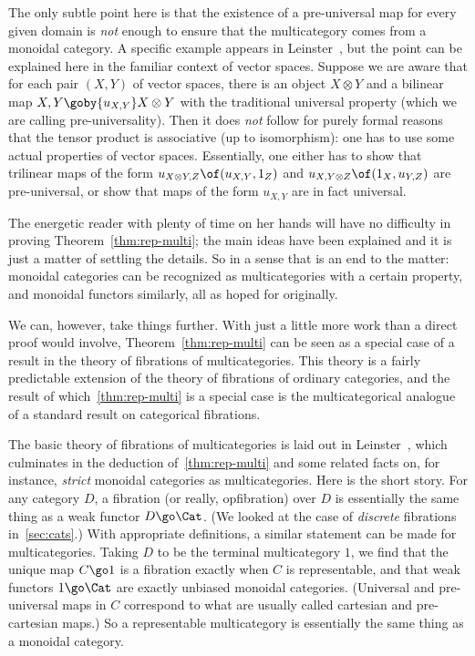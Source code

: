 The only subtle point here is that the existence of a pre-universal map for
every given domain is \emph{not} enough to ensure that the multicategory
comes from a monoidal category.  A specific example appears in
Leinster~\cite{FM}, but the point can be explained here in the familiar
context of vector spaces.  Suppose we are aware that for each pair $(X, Y)$
of vector spaces, there is an object $X\otimes Y$ and a bilinear map $X, Y
\goby{u_{X,Y}} X\otimes Y$ with the traditional universal property (which
we are calling pre-universality).  Then it does \emph{not} follow for
purely formal reasons that the tensor product is associative (up to
isomorphism): one has to use some actual properties of vector spaces.
Essentially, one either has to show that trilinear maps of the form
$u_{X\otimes Y, Z} \of (u_{X,Y}, 1_Z)$ and $u_{X, Y\otimes Z} \of (1_X,
u_{Y,Z})$ are pre-universal, or show that maps of the form $u_{X,Y}$ are in
fact universal.

The energetic reader with plenty of time on her hands will have no
difficulty in proving Theorem~\ref{thm:rep-multi}; the main ideas have been
explained and it is just a matter of settling the details.  So in a sense
that is an end to the matter: monoidal categories can be recognized as
multicategories with a certain property, and monoidal functors similarly,
all as hoped for originally.

We can, however, take things further.  With just a little more work than a
direct proof would involve, Theorem~\ref{thm:rep-multi} can be seen as a
special case of a result in the theory of fibrations%
%
%
of multicategories.
This theory is a fairly predictable extension of the theory of fibrations
of ordinary categories, and the result of which~\ref{thm:rep-multi} is a
special case is the multicategorical analogue of a standard result on
categorical fibrations.

The basic theory of fibrations of multicategories is laid out in
Leinster~\cite{FM}, which culminates in the deduction of~\ref{thm:rep-multi}
and some related facts on, for instance, \emph{strict} monoidal categories
as multicategories.  Here is the short story.  For any category $D$, a
fibration (or really, opfibration)
over $D$ is essentially the same thing as a weak functor $D \go \Cat$.  (We
looked at the case of \emph{discrete} fibrations in~\ref{sec:cats}.)  With
appropriate definitions, a similar statement can be made for
multicategories.  Taking $D$ to be the terminal multicategory $1$, we find
that the unique map $C \go 1$ is a fibration exactly when $C$ is
representable, and that weak functors $1 \go \Cat$ are exactly unbiased
monoidal categories.  (Universal and pre-universal maps in $C$ correspond
to what are usually called cartesian and pre-cartesian maps.)  So a
representable multicategory is essentially the same thing as a monoidal
category.%
%
%


